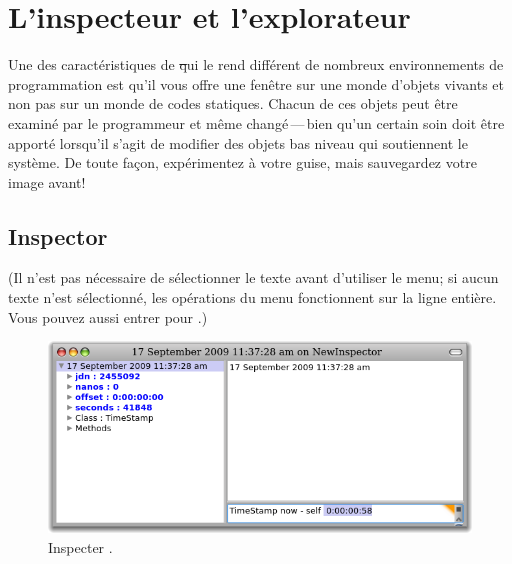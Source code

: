 \documentclass[a4paper,10pt,twoside]{book}
\begin{document}
\section{L'inspecteur  et l'explorateur} %

Une des caractéristiques de \st qui le rend différent de nombreux 
environnements de programmation est qu'il vous offre une fenêtre 
sur une monde d'objets vivants et non pas sur un monde de codes statiques.
Chacun de ces objets peut être examiné par le programmeur et même
changé\,---\,bien qu'un certain soin doit être apporté lorsqu'il s'agit
de modifier des objets bas niveau qui soutiennent le système.
De toute façon, expérimentez à votre guise, mais sauvegardez votre
image avant!

\subsection{Inspector}

(Il n'est pas nécessaire de sélectionner le texte avant d'utiliser le menu;
si aucun texte n'est sélectionné, les opérations du menu fonctionnent
sur la ligne entière.
Vous pouvez aussi entrer  pour .)

\begin{figure}[btp]
	\begin{center}
		\includegraphics[width=\textwidth]{inspectTimeNow1}
	\end{center}
	\caption{Inspecter .}
\end{figure}
\end{document}
